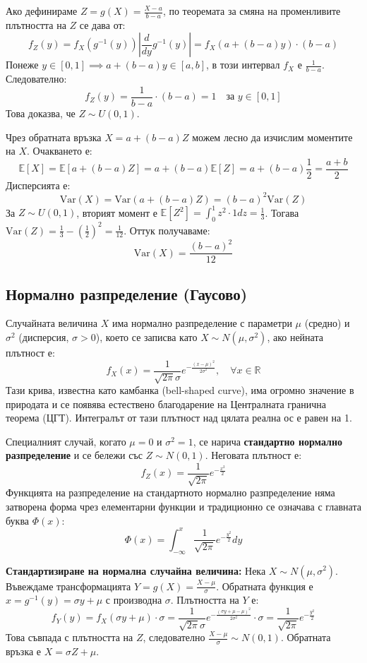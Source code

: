 \documentclass{article}
\begin{document}
Ако дефинираме $Z = g(X) = \frac{X-a}{b-a}$, по теоремата за смяна на променливите плътността на $Z$ се дава от:
\[
f_Z(y) = f_X(g^{-1}(y)) \left| \frac{d}{dy} g^{-1}(y) \right| = f_X(a + (b-a)y) \cdot (b-a)
\]
Понеже $y \in [0, 1] \implies a + (b-a)y \in [a, b]$, в този интервал $f_X$ е $\frac{1}{b-a}$. Следователно:
\[
f_Z(y) = \frac{1}{b-a} \cdot (b-a) = 1 \quad \text{за } y \in [0, 1]
\]
Това доказва, че $Z \sim U(0, 1)$. 

Чрез обратната връзка $X = a + (b-a)Z$ можем лесно да изчислим моментите на $X$. Очакването е:
\[
\mathbb{E}[X] = \mathbb{E}[a + (b-a)Z] = a + (b-a)\mathbb{E}[Z] = a + (b-a)\frac{1}{2} = \frac{a+b}{2}
\]
Дисперсията е:
\[
\text{Var}(X) = \text{Var}(a + (b-a)Z) = (b-a)^2 \text{Var}(Z)
\]
За $Z \sim U(0,1)$, вторият момент е $\mathbb{E}[Z^2] = \int_0^1 z^2 \cdot 1 dz = \frac{1}{3}$. Тогава $\text{Var}(Z) = \frac{1}{3} - \left(\frac{1}{2}\right)^2 = \frac{1}{12}$. Оттук получаваме:
\[
\text{Var}(X) = \frac{(b-a)^2}{12}
\]

\subsection{Нормално разпределение (Гаусово)}

Случайната величина $X$ има нормално разпределение с параметри $\mu$ (средно) и $\sigma^2$ (дисперсия, $\sigma > 0$), което се записва като $X \sim N(\mu, \sigma^2)$, ако нейната плътност е:
\[
f_X(x) = \frac{1}{\sqrt{2\pi}\sigma} e^{-\frac{(x-\mu)^2}{2\sigma^2}}, \quad \forall x \in \mathbb{R}
\]
Тази крива, известна като камбанка (bell-shaped curve), има огромно значение в природата и се появява естествено благодарение на Централната гранична теорема (ЦГТ). Интегралът от тази плътност над цялата реална ос е равен на 1.

Специалният случай, когато $\mu = 0$ и $\sigma^2 = 1$, се нарича \textbf{стандартно нормално разпределение} и се бележи със $Z \sim N(0, 1)$. Неговата плътност е:
\[
f_Z(x) = \frac{1}{\sqrt{2\pi}} e^{-\frac{x^2}{2}}
\]
Функцията на разпределение на стандартното нормално разпределение няма затворена форма чрез елементарни функции и традиционно се означава с главната буква $\Phi(x)$:
\[
\Phi(x) = \int_{-\infty}^{x} \frac{1}{\sqrt{2\pi}} e^{-\frac{y^2}{2}} dy
\]

\textbf{Стандартизиране на нормална случайна величина:} 
Нека $X \sim N(\mu, \sigma^2)$. Въвеждаме трансформацията $Y = g(X) = \frac{X-\mu}{\sigma}$. Обратната функция е $x = g^{-1}(y) = \sigma y + \mu$ с производна $\sigma$.
Плътността на $Y$ е:
\[
f_Y(y) = f_X(\sigma y + \mu) \cdot \sigma = \frac{1}{\sqrt{2\pi}\sigma} e^{-\frac{(\sigma y + \mu - \mu)^2}{2\sigma^2}} \cdot \sigma = \frac{1}{\sqrt{2\pi}} e^{-\frac{y^2}{2}}
\]
Това съвпада с плътността на $Z$, следователно $\frac{X-\mu}{\sigma} \sim N(0, 1)$. Обратната връзка е $X = \sigma Z + \mu$.
\end{document}
